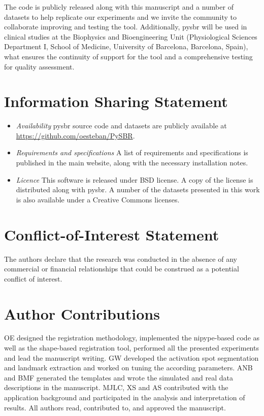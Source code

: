 \documentclass{frontiers}
\newcommand{\emitem}[1]{\item \emph{#1}}
\begin{document}
The code is publicly released along with this manuscript and
  a number of datasets to help replicate our experiments and we
  invite the community to collaborate improving and testing
  the tool.
Additionally, \gls*{pysbr} will be used in clinical studies 
  at the Biophysics and Bioengineering Unit (Physiological 
  Sciences Department I, School of Medicine, University of 
  Barcelona, Barcelona, Spain), what ensures the
  continuity of support for the tool and a comprehensive
  testing for quality assessment.

\section*{Information Sharing Statement}
\label{sec:iss}

\begin{itemize}
\emitem{Availability} \gls*{pysbr} source code and datasets are
  publicly available at \url{https://github.com/oesteban/PySBR}.

\emitem{Requirements and specifications} A list of requirements and
  specifications is published in the main website, along with
  the necessary installation notes.

\emitem{Licence} This software is released under BSD license.
  A copy of the license is distributed along with \gls*{pysbr}.
  A number of the datasets presented in this work is also
  available under a Creative Commons licenses.
\end{itemize}

\section*{Conflict-of-Interest Statement}
The authors declare that the research was conducted in the absence of any commercial or financial relationships 
that could be construed as a potential conflict of interest.

\section*{Author Contributions}
OE designed the registration methodology, implemented the \gls*{nipype}-based code
  as well as the shape-based registration tool, performed all the presented experiments
  and lead the manuscript writing.
GW developed the activation spot segmentation and landmark extraction
  and worked on tuning the according parameters.
ANB and BMF generated the templates and wrote the simulated and real data
  descriptions in the manuscript.
MJLC, XS and AS contributed with the application background and participated
  in the analysis and interpretation of results.
All authors read, contributed to, and approved the manuscript.
\end{document}
